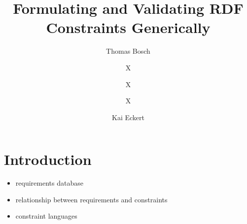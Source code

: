 \documentclass{llncs}
\begin{document}
%
%
\title{Formulating and Validating RDF Constraints Generically}
%
%
\author{Thomas Bosch \and X \and X \and X \and Kai Eckert}
%
%

\maketitle              %

\begin{abstract}


\end{abstract}
%


\section{Introduction}

\begin{itemize}
	\item requirements database
	\item relationship between requirements and constraints
	\item constraint languages
\end{itemize}



\end{document}
